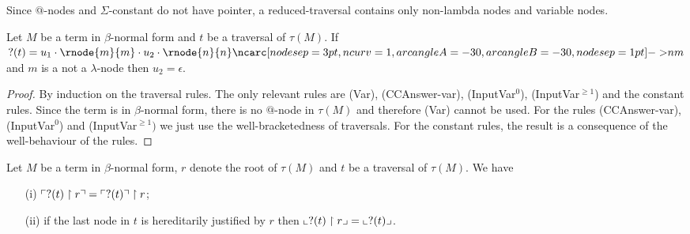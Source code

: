 Since $@$-nodes and $\Sigma$-constant do not have pointer, a reduced-traversal contains only
non-lambda nodes and variable nodes.


\begin{lem}
\label{lem:var_followedby_child}
Let $M$ be a term in $\beta$-normal form and $t$ be a traversal of $\tau(M)$.
If $?(t) = u_1 \cdot \rnode{m}{m} \cdot u_2 \cdot \rnode{n}{n} \bkptra[nodesep=1pt]{30}{n}{m}$ and $m$ is a not a $\lambda$-node then $u_2 = \epsilon$.
\end{lem}
\begin{proof}
By induction on the traversal rules. The only relevant rules are (Var), (CCAnswer-var), (InputVar$^0$), (InputVar$^{\geq 1}$)
and the constant rules.
Since the term is in $\beta$-normal form, there is no $@$-node in $\tau(M)$ and therefore (Var) cannot be used.
For the rules (CCAnswer-var), (InputVar$^0$) and (InputVar$^{\geq 1})$ we just use the well-bracketedness of traversals.
For the constant rules, the result is a consequence of the well-behaviour of the rules.
\end{proof}

\begin{lem}
\label{lem:redtrav_trav} Let $M$ be a term in $\beta$-normal form,
$r$ denote the root of $\tau(M)$ and $t$ be a traversal of $\tau(M)$. We have
\begin{itemize}
\item[(i)] $ \ulcorner ?(t) \upharpoonright  r  \urcorner = \ulcorner ?(t) \urcorner \upharpoonright r$;
\item[(ii)] if the last node in $t$ is hereditarily justified by $r$ then $ \llcorner ?(t) \upharpoonright r  \lrcorner = \llcorner ?(t) \lrcorner$.
\end{itemize}
\end{lem}


